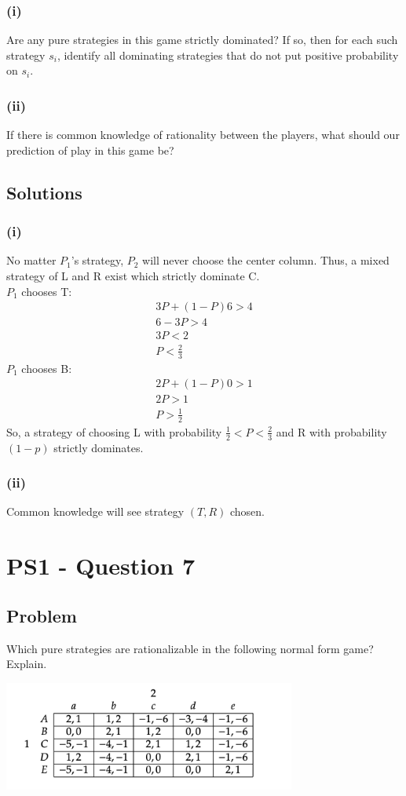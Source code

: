 \documentclass[10pt, a4paper]{article}
\begin{document}
    \subsubsection*{(i)}
      Are any pure strategies in this game strictly dominated? If so, then for each such strategy $s_i$, identify all dominating strategies that do not put positive probability on $s_i$.
    \subsubsection*{(ii)}
      If there is common knowledge of rationality between the players, what should our prediction of play in this game be?
  \subsection*{Solutions}
    \subsubsection*{(i)}
      No matter $P_1$'s strategy, $P_2$ will never choose the center column. Thus, a mixed strategy of L and R exist which strictly dominate C. \\
      $P_1$ chooses T: 
      \begin{gather*}
        3P + (1-P)6 > 4 \\
        6 - 3P > 4 \\
        3P < 2 \\
        P < \frac{2}{3} 
      \end{gather*}
      $P_1$ chooses B:
      \begin{gather*}
        2P + (1-P)0 > 1 \\
        2P > 1 \\
        P > \frac{1}{2}
      \end{gather*}
      So, a strategy of choosing L with probability $\frac{1}{2} < P < \frac{2}{3}$ and R with probability $(1-p)$ strictly dominates. 
    \subsubsection*{(ii)}
      Common knowledge will see strategy $(T,R)$ chosen. 
\section*{PS1 - Question 7}
  \subsection*{Problem}
    Which pure strategies are rationalizable in the following normal form game? Explain.
    \begin{center}
      \includegraphics[width = 0.72\textwidth]{PS1-7.png}
    \end{center}
\end{document}
